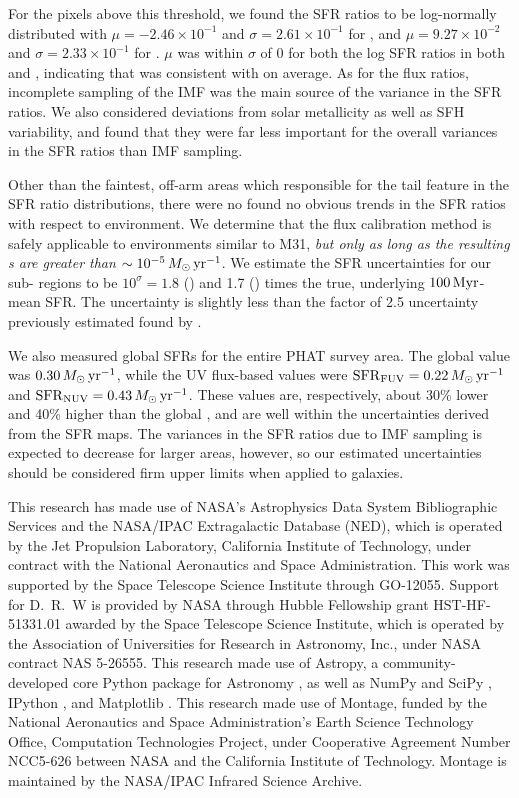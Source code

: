 For the pixels above this threshold, we found the SFR ratios to be log-normally
distributed with $\mu = -2.46\times 10^{-1}$ and $\sigma = 2.61\times 10^{-1}$
for \fuv{}, and $\mu = 9.27\times 10^{-2}$ and $\sigma = 2.33\times 10^{-1}$
for \nuv{}. $\mu$ was within $\sigma$ of 0 for both the log SFR ratios in both
\fuv{} and \nuv{}, indicating that \sfrx{} was consistent with \sfroneh{} on
average. As for the flux ratios, incomplete sampling of the IMF was the main
source of the variance in the SFR ratios. We also considered deviations from
solar metallicity as well as SFH variability, and found that they were far less
important for the overall variances in the SFR ratios than IMF sampling.

Other than the faintest, off-arm areas which responsible for the tail feature
in the SFR ratio distributions, there were no found no obvious trends in the
SFR ratios with respect to environment. We determine that the flux calibration
method is safely applicable to environments similar to M31, \emph{but only as
long as the resulting \sfr{}s are greater than $\sim 10^{-5}\,M_\odot\,\mathrm{yr}^{-1}$}. We
estimate the SFR uncertainties for our sub-\kpc{} regions to be $10^\sigma =
1.8$ (\fuv{}) and 1.7 (\nuv{}) times the true, underlying $100\,\mathrm{Myr}$-mean SFR.
The \sfrfuv{} uncertainty is slightly less than the factor of 2.5 uncertainty
previously estimated found by \citet{Simones:2014}.

We also measured global SFRs for the entire PHAT survey area. The global
\sfroneh{} value was $0.30\,M_\odot\,\mathrm{yr}^{-1}$, while the UV flux-based values were
$\mathrm{SFR}_{\mathrm{FUV}} = 0.22\,M_\odot\,\mathrm{yr}^{-1}$ and $\mathrm{SFR}_{\mathrm{NUV}} = 0.43\,M_\odot\,\mathrm{yr}^{-1}$. These values
are, respectively, about 30\% lower and 40\% higher than the global \sfroneh{},
and are well within the uncertainties derived from the SFR maps. The variances
in the SFR ratios due to IMF sampling is expected to decrease for larger areas,
however, so our estimated uncertainties should be considered firm upper limits
when applied to galaxies.

This research has made use of NASA's Astrophysics Data System Bibliographic
Services and the NASA/IPAC Extragalactic Database (NED), which is operated by
the Jet Propulsion Laboratory, California Institute of Technology, under
contract with the National Aeronautics and Space Administration. This work was
supported by the Space Telescope Science Institute through GO-12055. Support
for D.~R.~W is provided by NASA through Hubble Fellowship grant HST-HF-51331.01
awarded by the Space Telescope Science Institute, which is operated by the
Association of Universities for Research in Astronomy, Inc., under NASA
contract NAS 5-26555. This research made use of Astropy, a community-developed
core Python package for Astronomy \citep{Astropy_Collaboration:2013}, as well
as NumPy and SciPy \citep{Oliphant:2007}, IPython \citep{Perez:2007}, and
Matplotlib \citep{Hunter:2007}. This research made use of Montage, funded by
the National Aeronautics and Space Administration's Earth Science Technology
Office, Computation Technologies Project, under Cooperative Agreement Number
NCC5-626 between NASA and the California Institute of Technology. Montage is
maintained by the NASA/IPAC Infrared Science Archive.

